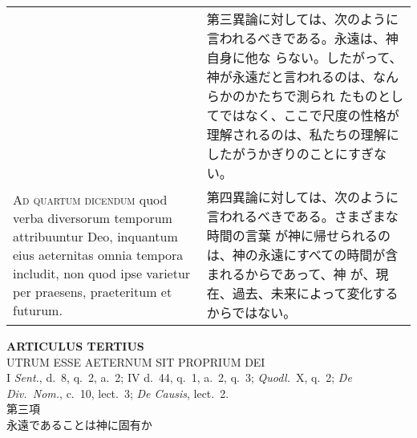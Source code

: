 \documentclass[10pt]{jsarticle} %
\begin{document}
\begin{longtable}{p{21em}p{21em}}
&

第三異論に対しては、次のように言われるべきである。永遠は、神自身に他な
らない。したがって、神が永遠だと言われるのは、なんらかのかたちで測られ
たものとしてではなく、ここで尺度の性格が理解されるのは、私たちの理解に
したがうかぎりのことにすぎない。

\\


{\scshape Ad quartum dicendum} quod verba diversorum temporum attribuuntur Deo,
inquantum eius aeternitas omnia tempora includit, non quod ipse varietur
per praesens, praeteritum et futurum.

&

第四異論に対しては、次のように言われるべきである。さまざまな時間の言葉
が神に帰せられるのは、神の永遠にすべての時間が含まれるからであって、神
が、現在、過去、未来によって変化するからではない。

\end{longtable}

\newpage
{}


\begin{center}
 {\Large {\bf ARTICULUS TERTIUS}}\\
 {\large UTRUM ESSE AETERNUM SIT PROPRIUM DEI}\\
 {\footnotesize I {\itshape Sent.}, d.~8, q.~2, a.~2; IV d.~44, q.~1,
 a.~2, q.~3; {\itshape Quodl.}~X, q.~2; {\itshape De Div.~Nom.}, c.~10,
 lect.~3; {\itshape De Causis}, lect.~2.}\\
 {\Large 第三項\\永遠であることは神に固有か}
\end{center}
\end{document}
